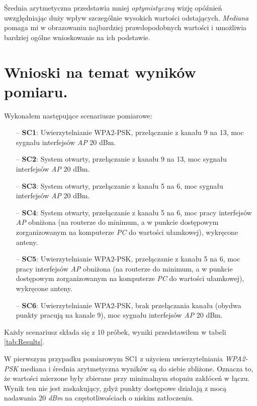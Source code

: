 Średnia arytmetyczna przedstawia mniej \emph{optymistyczną} wizję opóźnień uwzględniając duży wpływ szczególnie wysokich wartości odstających. \emph{Mediana} pomaga mi w obrazowaniu najbardziej prawdopodobnych wartości i umożliwia bardziej ogólne wnioskowanie na ich podstawie.

\section{Wnioski na temat wyników pomiaru.}

Wykonałem następujące scenariusze pomiarowe:
\begin{itemize}
\item[--] {\bf SC1}: Uwierzytelnianie WPA2-PSK, przełączanie z kanału 9 na 13, moc sygnału interfejsów \emph{AP} 20 dBm.
\item[--] {\bf SC2}: System otwarty, przełączanie z kanału 9 na 13, moc sygnału interfejsów \emph{AP} 20 dBm.
\item[--] {\bf SC3}: System otwarty, przełączanie z kanału 5 na 6, moc sygnału interfejsów \emph{AP} 20 dBm.
\item[--] {\bf SC4}: System otwarty, przełączanie z kanału 5 na 6, moc pracy interfejsów \emph{AP} obniżona (na routerze do minimum, a w punkcie dostępowym zorganizowanym na komputerze \emph{PC} do wartości ułamkowej), wykręcone anteny.
\item[--] {\bf SC5}: Uwierzytelnianie WPA2-PSK, przełączanie z kanału 5 na 6, moc pracy interfejsów \emph{AP} obniżona (na routerze do minimum, a w punkcie dostępowym zorganizowanym na komputerze \emph{PC} do wartości ułamkowej), wykręcone anteny.
\item[--] {\bf SC6}: Uwierzytelnianie WPA2-PSK, brak przełączania kanału (obydwa punkty pracują na kanale 9), moc sygnału interfejsów \emph{AP} 20 dBm.
\end{itemize}

Każdy scenariusz składa się z 10 próbek, wyniki przedstawiłem w tabeli \ref{tab:Results}.

W pierwszym przypadku pomiarowym SC1 z użyciem uwierzytelniania \emph{WPA2-PSK} mediana i średnia arytmetyczna wyników są do siebie zbliżone. Oznacza to, że wartości mierzone były zbierane przy minimalnym stopniu zakłóceń w łączu. Wynik ten nie jest zaskakujący, gdyż punkty dostępowe działają z mocą nadawania 20 \emph{dBm} na częstotliwościach o niskim zatłoczeniu.

